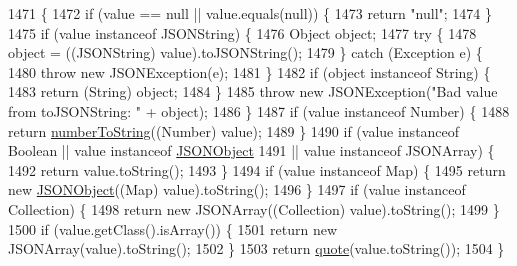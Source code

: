 \begin{DoxyCode}
1471                                                                           \{
1472         \textcolor{keywordflow}{if} (value == null || value.equals(null)) \{
1473             \textcolor{keywordflow}{return} \textcolor{stringliteral}{"null"};
1474         \}
1475         \textcolor{keywordflow}{if} (value instanceof JSONString) \{
1476             Object object;
1477             \textcolor{keywordflow}{try} \{
1478                 \textcolor{keywordtype}{object} = ((JSONString) value).toJSONString();
1479             \} \textcolor{keywordflow}{catch} (Exception e) \{
1480                 \textcolor{keywordflow}{throw} \textcolor{keyword}{new} JSONException(e);
1481             \}
1482             \textcolor{keywordflow}{if} (\textcolor{keywordtype}{object} instanceof String) \{
1483                 \textcolor{keywordflow}{return} (String) object;
1484             \}
1485             \textcolor{keywordflow}{throw} \textcolor{keyword}{new} JSONException(\textcolor{stringliteral}{"Bad value from toJSONString: "} + \textcolor{keywordtype}{object});
1486         \}
1487         \textcolor{keywordflow}{if} (value instanceof Number) \{
1488             \textcolor{keywordflow}{return} \hyperlink{classorg_1_1json_1_1_j_s_o_n_object_a5ea1eb29e2e3bdc7b4fae0579ead8525}{numberToString}((Number) value);
1489         \}
1490         \textcolor{keywordflow}{if} (value instanceof Boolean || value instanceof \hyperlink{classorg_1_1json_1_1_j_s_o_n_object_a7c17e59daff74ce50c6677c6f5da233d}{JSONObject}
1491                 || value instanceof JSONArray) \{
1492             \textcolor{keywordflow}{return} value.toString();
1493         \}
1494         \textcolor{keywordflow}{if} (value instanceof Map) \{
1495             \textcolor{keywordflow}{return} \textcolor{keyword}{new} \hyperlink{classorg_1_1json_1_1_j_s_o_n_object_a7c17e59daff74ce50c6677c6f5da233d}{JSONObject}((Map) value).toString();
1496         \}
1497         \textcolor{keywordflow}{if} (value instanceof Collection) \{
1498             \textcolor{keywordflow}{return} \textcolor{keyword}{new} JSONArray((Collection) value).toString();
1499         \}
1500         \textcolor{keywordflow}{if} (value.getClass().isArray()) \{
1501             \textcolor{keywordflow}{return} \textcolor{keyword}{new} JSONArray(value).toString();
1502         \}
1503         \textcolor{keywordflow}{return} \hyperlink{classorg_1_1json_1_1_j_s_o_n_object_abe60222a3919d3f88f104486c1ef13fe}{quote}(value.toString());
1504     \}
\end{DoxyCode}

